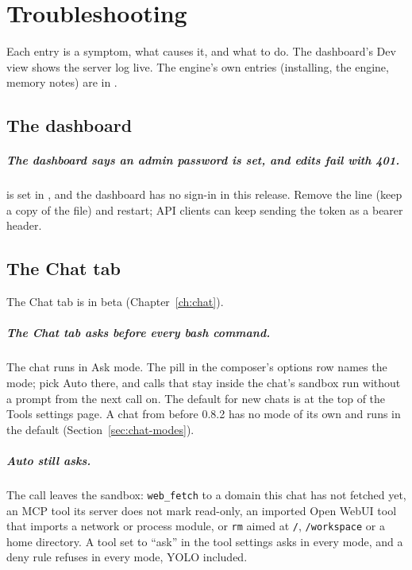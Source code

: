 \chapter{Troubleshooting}\label{ch:troubleshooting}

Each entry is a symptom, what causes it, and what to do. The dashboard's Dev view shows the server log live. The engine's own entries (installing, the engine, memory notes) are in .

\section{The dashboard}

\paragraph{The dashboard says an admin password is set, and edits fail with 401.}  is set in , and the dashboard has no sign-in in this release. Remove the line (keep a copy of the file) and restart; API clients can keep sending the token as a bearer header.

\section{The Chat tab}\label{sec:trouble-chat}

The Chat tab is in beta (Chapter~\ref{ch:chat}).

\paragraph{The Chat tab asks before every bash command.} The chat runs in Ask mode. The pill in the composer's options row names the mode; pick Auto there, and calls that stay inside the chat's sandbox run without a prompt from the next call on. The default for new chats is at the top of the Tools settings page. A chat from before 0.8.2 has no mode of its own and runs in the default (Section~\ref{sec:chat-modes}).

\paragraph{Auto still asks.} The call leaves the sandbox: \texttt{web\_fetch} to a domain this chat has not fetched yet, an MCP tool its server does not mark read-only, an imported Open WebUI tool that imports a network or process module, or \texttt{rm} aimed at \texttt{/}, \texttt{/workspace} or a home directory. A tool set to \enquote{ask} in the tool settings asks in every mode, and a deny rule refuses in every mode, YOLO included.

